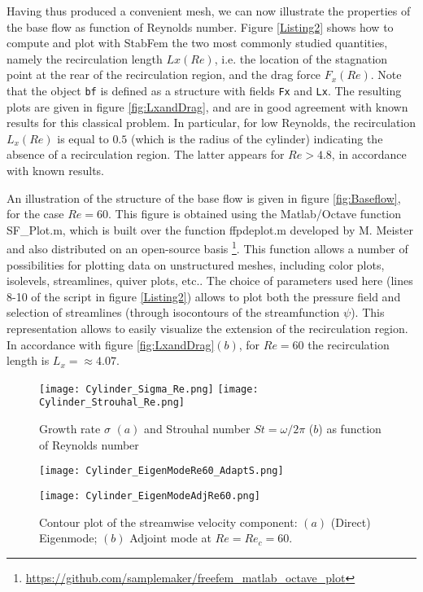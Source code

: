 \documentclass[twocolumn,10pt]{asme2ej}
\begin{document}
Having thus produced a convenient mesh, we can now illustrate the properties of the base flow as function of Reynolds number. Figure \ref{Listing2} shows how to compute and plot with StabFem the two most commonly studied quantities, namely the recirculation length $Lx(Re)$, i.e. the location of the stagnation point at the rear of the recirculation region, and the drag force $F_x(Re)$.
Note that the object \verb|bf| is defined as a structure with fields \verb|Fx| and \verb|Lx|. 
The resulting plots are given in figure \ref{fig:LxandDrag}, and are in good agreement with known results for this classical problem.
In particular, for low Reynolds, the recirculation $L_x(Re)$ is equal to $0.5$ (which is the radius of the cylinder) indicating the absence of a recirculation region. The latter appears for $Re > 4.8$, in accordance with known results.

An illustration of the structure of the base flow is given in figure \ref{fig:Baseflow},  for the case $Re = 60$. This figure is obtained using the Matlab/Octave function {\sf  SF\_Plot.m}, which is built over the function {\sf  ffpdeplot.m} developed by M. Meister and also distributed on an open-source basis
\footnote{\url{https://github.com/samplemaker/freefem\_matlab\_octave\_plot}}.  
This function allows a number of possibilities for plotting data on unstructured meshes, including color plots, isolevels, streamlines, quiver plots, etc.. The choice of parameters used here (lines 8-10 of the script in figure \ref{Listing2})  allows to plot both the pressure field and selection of streamlines (through isocontours of the streamfunction $\psi$). This representation allows to easily visualize the extension of the recirculation region. In accordance with figure \ref{fig:LxandDrag}$(b)$, for $Re = 60$ the recirculation length is $L_x = \approx 4.07$.





\begin{figure}
\texttt{[image: Cylinder\_Sigma\_Re.png]}
\texttt{[image: Cylinder\_Strouhal\_Re.png]}
\caption{Growth rate $\sigma$ $(a)$  and Strouhal number $St = \omega/2\pi$ ($b$) as function of Reynolds number}
\label{fig:SigmaOmega}
\end{figure}

\begin{figure}
\texttt{[image: Cylinder\_EigenModeRe60\_AdaptS.png]}%

\texttt{[image: Cylinder\_EigenModeAdjRe60.png]}
\caption{Contour plot of the streamwise velocity component: $(a)$ (Direct) Eigenmode; $(b)$ Adjoint mode at $Re=Re_c = 60$.}
\label{fig:Eigenmode}
\end{figure}
\end{document}
